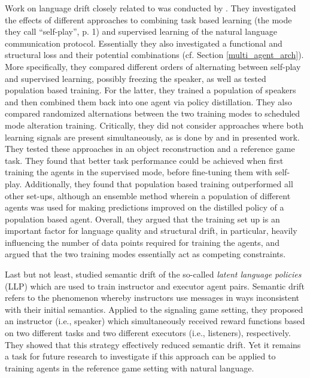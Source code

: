 Work on language drift closely related to \cite{lazaridou2020multi} was conducted by \cite{lowe2020interaction}. They investigated the effects of different approaches to combining task based learning (the mode they call ``self-play'', p. 1) and supervised learning of the natural language communication protocol. Essentially they also investigated a functional and structural loss and their potential combinations (cf. Section \ref{multi_agent_arch}). %
More specifically, they compared different orders of alternating between self-play and supervised learning, possibly freezing the speaker, as well as tested population based training. For the latter, they trained a population of speakers and then combined them back into one agent via policy distillation. They also compared randomized alternations between the two training modes to scheduled mode alteration training. 
Critically, they did not consider approaches where both learning signals are present simultaneously, as is done by \cite{lazaridou2020multi} and in presented work. They tested these approaches in an object reconstruction and a reference game task.
They found that better task performance could be achieved when first training the agents in the supervised mode, before fine-tuning them with self-play. Additionally, they found that population based training outperformed all other set-ups, although an ensemble method wherein a population of different agents was used for making predictions improved on the distilled policy of a population based agent. Overall, they argued that the training set up is an important factor for language quality and structural drift, in particular, heavily influencing the number of data points required for training the agents, and argued that the two training modes essentially act as competing constraints.  

Last but not least, \cite{jacob2021multitasking} studied semantic drift of the so-called \textit{latent language policies} (LLP) which are used to train instructor and executor agent pairs. Semantic drift refers to the phenomenon whereby instructors use messages in ways inconsistent with their initial semantics. Applied to the signaling game setting, they proposed an instructor (i.e., speaker) which simultaneously received reward functions based on two different tasks and two different executors (i.e., listeners), respectively. They showed that this strategy effectively reduced semantic drift. Yet it remains a task for future research to investigate if this approach can be applied to training agents in the reference game setting with natural language.


